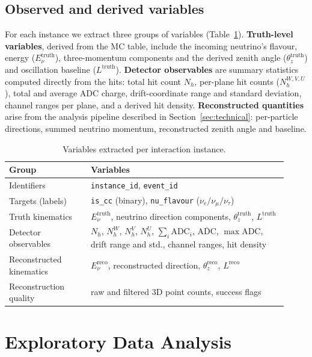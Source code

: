 \documentclass[11pt,a4paper]{article}
\begin{document}
\subsection{Observed and derived variables}
For each instance we extract three groups of variables (Table~\ref{tab:variables}).
\textbf{Truth-level variables}, derived from the MC table, include the incoming neutrino's flavour, energy ($E_\nu^{\text{truth}}$), three-momentum components and the derived zenith angle ($\theta_z^{\text{truth}}$) and oscillation baseline ($L^{\text{truth}}$).  \textbf{Detector observables} are summary statistics computed directly from the hits: total hit count $N_h$, per-plane hit counts ($N_h^{W,V,U}$), total and average ADC charge, drift-coordinate range and standard deviation, channel ranges per plane, and a derived hit density.  \textbf{Reconstructed quantities} arise from the analysis pipeline described in Section~\ref{sec:technical}: per-particle directions, summed neutrino momentum, reconstructed zenith angle and baseline.

\begin{table}[ht]
\centering
\small
\begin{tabular}{p{0.27\linewidth}p{0.65\linewidth}}
\toprule
\textbf{Group} & \textbf{Variables} \\
\midrule
Identifiers & \texttt{instance\_id}, \texttt{event\_id} \\
Targets (labels) & \texttt{is\_cc} (binary), \texttt{nu\_flavour} ($\nu_e/\nu_\mu/\nu_\tau$) \\
Truth kinematics & $E_\nu^{\text{truth}}$, neutrino direction components, $\theta_z^{\text{truth}}$, $L^{\text{truth}}$ \\
Detector observables & $N_h$, $N_h^{W}$, $N_h^{V}$, $N_h^{U}$, $\sum_i \mathrm{ADC}_i$, $\overline{\mathrm{ADC}}$, $\max\mathrm{ADC}$, drift range and std., channel ranges, hit density \\
Reconstructed kinematics & $E_\nu^{\text{reco}}$, reconstructed direction, $\theta_z^{\text{reco}}$, $L^{\text{reco}}$ \\
Reconstruction quality & raw and filtered 3D point counts, success flags \\
\bottomrule
\end{tabular}
\caption{Variables extracted per interaction instance.}
\label{tab:variables}
\end{table}

\section{Exploratory Data Analysis}
\label{sec:eda}
\end{document}
